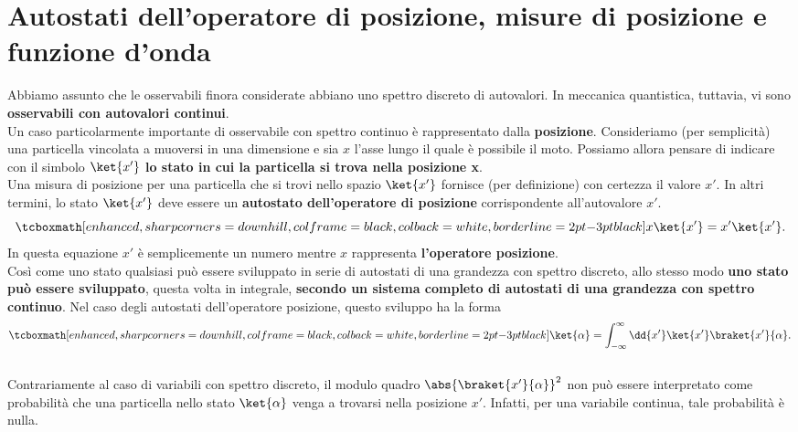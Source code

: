 \chapter[Autostati dell'operatore di posizione]{Autostati dell'operatore di posizione, misure di posizione e funzione d'onda}
Abbiamo assunto che le osservabili finora considerate abbiano uno spettro discreto di autovalori. In meccanica quantistica, tuttavia, vi sono \textbf{osservabili con autovalori continui}.\\

Un caso particolarmente importante di osservabile con spettro continuo è rappresentato dalla \textbf{posizione}.
Consideriamo (per semplicità) una particella vincolata a muoversi in una dimensione e sia $x$ l'asse lungo il quale è possibile il moto. Possiamo allora pensare di indicare con il simbolo $\ket{x'}$ \textbf{lo stato in cui la particella si trova nella posizione x}.\\

Una misura di posizione per una particella che si trovi nello spazio $\ket{x'}$ fornisce (per definizione) con certezza il valore $x'$. In altri termini, lo stato $\ket{x'}$ deve essere un \textbf{autostato dell'operatore di posizione} corrispondente all'autovalore $x'$.
	\begin{equation}
 		\tcboxmath[enhanced, sharp corners=downhill, colframe=black, colback=white, borderline={2pt}{-3pt}{black}]{
 			x\ket{x'} = x'\ket{x'} .
 			}
	\end{equation}
In questa equazione $x'$ è semplicemente un numero mentre $x$ rappresenta \textbf{l'operatore posizione}.\\

Così come uno stato qualsiasi può essere sviluppato in serie di autostati di una grandezza con spettro discreto, allo stesso modo \textbf{uno stato può essere sviluppato}, questa volta in integrale, \textbf{secondo un sistema completo di autostati di una grandezza con spettro continuo}. Nel caso degli autostati dell'operatore posizione, questo sviluppo ha la forma
	\begin{equation}
 	\label{eq:cap5_1}
 		\tcboxmath[enhanced, sharp corners=downhill, colframe=black, colback=white, borderline={2pt}{-3pt}{black}]{
			\ket{\alpha} = \int_{-\infty}^{\infty}\dd{x'}\ket{x'}\braket{x'}{\alpha} .
			}
	\end{equation}\\
	
Contrariamente al caso di variabili con spettro discreto, il modulo quadro $\abs{\braket{x'}{\alpha}}^2$ non può essere interpretato come probabilità che una particella nello stato $\ket{\alpha}$ venga a trovarsi nella posizione $x'$. Infatti, per una variabile continua, tale probabilità è nulla.\\

